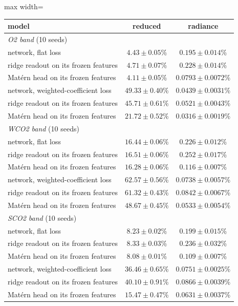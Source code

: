 \begin{adjustbox}{max width=\linewidth}
\begin{tabular}{lcc}
\toprule
model & reduced & radiance \\
\midrule
\multicolumn{3}{l}{\emph{O2 band} (10 seeds)} \\
network, flat loss & $4.43\pm0.05$\% & $0.195\pm0.014$\% \\
\quad ridge readout on its frozen features & $4.71\pm0.07$\% & $0.228\pm0.014$\% \\
\quad Mat\'ern head on its frozen features & $4.11\pm0.05$\% & $0.0793\pm0.0072$\% \\
network, weighted-coefficient loss & $49.33\pm0.40$\% & $0.0439\pm0.0031$\% \\
\quad ridge readout on its frozen features & $45.71\pm0.61$\% & $0.0521\pm0.0043$\% \\
\quad Mat\'ern head on its frozen features & $21.72\pm0.52$\% & $0.0316\pm0.0019$\% \\
\multicolumn{3}{l}{\emph{WCO2 band} (10 seeds)} \\
network, flat loss & $16.44\pm0.06$\% & $0.226\pm0.012$\% \\
\quad ridge readout on its frozen features & $16.51\pm0.06$\% & $0.252\pm0.017$\% \\
\quad Mat\'ern head on its frozen features & $16.28\pm0.06$\% & $0.116\pm0.007$\% \\
network, weighted-coefficient loss & $62.57\pm0.56$\% & $0.0738\pm0.0057$\% \\
\quad ridge readout on its frozen features & $61.32\pm0.43$\% & $0.0842\pm0.0067$\% \\
\quad Mat\'ern head on its frozen features & $48.67\pm0.45$\% & $0.0533\pm0.0054$\% \\
\multicolumn{3}{l}{\emph{SCO2 band} (10 seeds)} \\
network, flat loss & $8.23\pm0.02$\% & $0.199\pm0.015$\% \\
\quad ridge readout on its frozen features & $8.33\pm0.03$\% & $0.236\pm0.032$\% \\
\quad Mat\'ern head on its frozen features & $8.08\pm0.01$\% & $0.109\pm0.007$\% \\
network, weighted-coefficient loss & $36.46\pm0.65$\% & $0.0751\pm0.0025$\% \\
\quad ridge readout on its frozen features & $40.10\pm0.91$\% & $0.0866\pm0.0039$\% \\
\quad Mat\'ern head on its frozen features & $15.47\pm0.47$\% & $0.0631\pm0.0037$\% \\
\bottomrule
\end{tabular}
\end{adjustbox}
